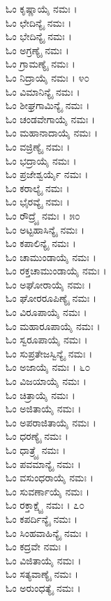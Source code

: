 \begin{multicols}{2}
ಓಂ ಕೃಷ್ಣಾಯೈ ನಮಃ ।\\
ಓಂ ಛೇದಿನ್ಯೈ ನಮಃ ।\\
ಓಂ ಭೇದಿನ್ಯೈ ನಮಃ ।\\
ಓಂ ಅಗ್ರಣ್ಯೈ ನಮಃ ।\\
ಓಂ ಗ್ರಾಮಣ್ಯೈ ನಮಃ ।\\
ಓಂ ನಿದ್ರಾಯೈ ನಮಃ । ೪೦\\
ಓಂ ವಿಮಾನಿನ್ಯೈ ನಮಃ ।\\
ಓಂ ಶೀಘ್ರಗಾಮಿನ್ಯೈ ನಮಃ ।\\
ಓಂ ಚಂಡವೇಗಾಯೈ ನಮಃ ।\\
ಓಂ ಮಹಾನಾದಾಯೈ ನಮಃ ।\\
ಓಂ ವಜ್ರಿಣ್ಯೈ ನಮಃ ।\\
ಓಂ ಭದ್ರಾಯೈ ನಮಃ ।\\
ಓಂ ಪ್ರಜೇಶ್ವರ್ಯೈ ನಮಃ ।\\
ಓಂ ಕರಾಲ್ಯೈ ನಮಃ ।\\
ಓಂ ಭೈರವ್ಯೈ ನಮಃ ।\\
ಓಂ ರೌದ್ರ್ಯೈ ನಮಃ । ೫೦\\
ಓಂ ಅಟ್ಟಹಾಸಿನ್ಯೈ ನಮಃ ।\\
ಓಂ ಕಪಾಲಿನ್ಯೈ ನಮಃ ।\\
ಓಂ ಚಾಮುಂಡಾಯೈ ನಮಃ ।\\
ಓಂ ರಕ್ತಚಾಮುಂಡಾಯೈ ನಮಃ ।\\
ಓಂ ಅಘೋರಾಯೈ ನಮಃ ।\\
ಓಂ ಘೋರರೂಪಿಣ್ಯೈ ನಮಃ ।\\
ಓಂ ವಿರೂಪಾಯೈ ನಮಃ ।\\
ಓಂ ಮಹಾರೂಪಾಯೈ ನಮಃ ।\\
ಓಂ ಸ್ವರೂಪಾಯೈ ನಮಃ ।\\
ಓಂ ಸುಪ್ರತೇಜಸ್ವಿನ್ಯೈ ನಮಃ ।\\
ಓಂ ಅಜಾಯೈ ನಮಃ । ೬೦\\
ಓಂ ವಿಜಯಾಯೈ ನಮಃ ।\\
ಓಂ ಚಿತ್ರಾಯೈ ನಮಃ ।\\
ಓಂ ಅಜಿತಾಯೈ ನಮಃ ।\\
ಓಂ ಅಪರಾಜಿತಾಯೈ ನಮಃ ।\\
ಓಂ ಧರಣ್ಯೈ ನಮಃ ।\\
ಓಂ ಧಾತ್ರ್ಯೈ ನಮಃ ।\\
ಓಂ ಪವಮಾನ್ಯೈ ನಮಃ ।\\
ಓಂ ವಸುಂಧರಾಯೈ ನಮಃ ।\\
ಓಂ ಸುವರ್ಣಾಯೈ ನಮಃ ।\\
ಓಂ ರಕ್ತಾಕ್ಷ್ಯೈ ನಮಃ । ೭೦\\
ಓಂ ಕಪರ್ದಿನ್ಯೈ ನಮಃ ।\\
ಓಂ ಸಿಂಹವಾಹಿನ್ಯೈ ನಮಃ ।\\
ಓಂ ಕದ್ರವೇ ನಮಃ ।\\
ಓಂ ವಿಜಿತಾಯೈ ನಮಃ ।\\
ಓಂ ಸತ್ಯವಾಣ್ಯೈ ನಮಃ ।\\
ಓಂ ಅರುಂಧತ್ಯೈ ನಮಃ ।\\

\end{multicols}
